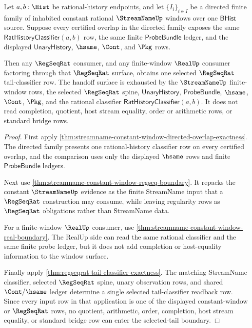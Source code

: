 \begin{theorem}
\label{thm:streamname-constant-window-directed-regseq-real-tail-boundary}
Let $a,b:\Hist$ be rational-history endpoints, and let
$\{I_i\}_{i\in I}$ be a directed finite family of inhabited constant rational
$\StreamNameUp$ windows over one $\mathsf{BHist}$ source. Suppose every
certified overlap in the directed family exposes the same
$\mathsf{RatHistoryClassifier}(a,b)$ row, the same finite
$\mathsf{ProbeBundle}$ ledger, and the displayed $\mathsf{UnaryHistory}$,
$\hsame$, $\Cont$, and $\Pkg$ rows.

Then any $\RegSeqRat$ consumer, and any finite-window $\RealUp$ consumer
factoring through that $\RegSeqRat$ surface, obtains one selected
$\RegSeqRat$ tail-classifier row. The handoff surface is exhausted by the
$\StreamNameUp$ finite-window rows, the selected $\RegSeqRat$ spine,
$\mathsf{UnaryHistory}$, $\mathsf{ProbeBundle}$, $\hsame$, $\Cont$, $\Pkg$,
and the rational classifier $\mathsf{RatHistoryClassifier}(a,b)$. It does not
read completion, quotient, host stream equality, order or arithmetic rows, or
standard bridge rows.
\end{theorem}
\begin{proof}
First apply
\autoref{thm:streamname-constant-window-directed-overlap-exactness}. The
directed family presents one rational-history classifier row on every
certified overlap, and the comparison uses only the displayed $\hsame$ rows
and finite $\mathsf{ProbeBundle}$ ledgers.

Next use \autoref{thm:streamname-constant-window-regseq-boundary}. It repacks
the constant $\StreamNameUp$ evidence as the finite StreamName input that a
$\RegSeqRat$ construction may consume, while leaving regularity rows as
$\RegSeqRat$ obligations rather than StreamName data.

For a finite-window $\RealUp$ consumer, use
\autoref{thm:streamname-constant-window-real-boundary}. The RealUp side can
read the same rational classifier and the same finite probe ledger, but it
does not add completion or host-equality information to the window surface.

Finally apply \autoref{thm:regseqrat-tail-classifier-exactness}. The matching
StreamName classifier, selected $\RegSeqRat$ spine, unary observation rows,
and shared $\Cont/\hsame$ ledger determine a single selected tail-classifier
readback row. Since every input row in that application is one of the displayed
constant-window or $\RegSeqRat$ rows, no quotient, arithmetic, order,
completion, host stream equality, or standard bridge row can enter the
selected-tail boundary.
\end{proof}

